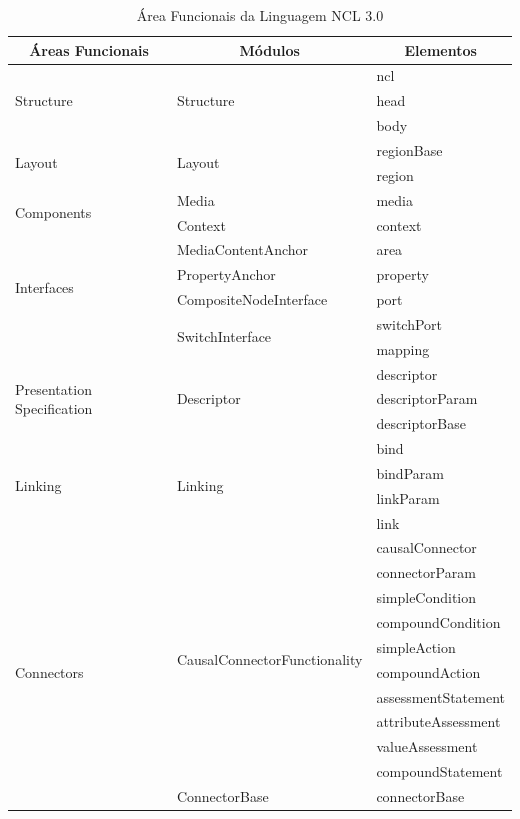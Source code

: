 \begin{table}[h]
\label{tab:modulosNCl}
\caption{Área Funcionais da Linguagem NCL 3.0 \cite{soares2009programando}}
\centering
{
  \renewcommand\arraystretch{1.0}
  \begin{tabular}{|p{4.5cm}|p{6cm}|p{4cm}|} \hline
   \multicolumn{1}{|c|}{Áreas Funcionais} & \multicolumn{1}{c|}{Módulos} & \multicolumn{1}{c|}{Elementos} \\\hline 
   
   \multirow{3}{*}{Structure} & \multirow{3}{*}{Structure} & ncl\\\cline{3-3} && head\\\cline{3-3} && body\\\hline
   
   \multirow{2}{*}{Layout} & \multirow{2}{*}{Layout} & regionBase\\\cline{3-3} && region\\\hline
   \multirow{2}{*}{Components} & Media & media\\\cline{2-3} & Context & context\\\hline
   
   \multirow{4}{*}{Interfaces} & MediaContentAnchor & area\\\cline{2-3}
   & PropertyAnchor & property\\\cline{2-3}
   & CompositeNodeInterface & port\\\cline{2-3}
   &\multirow{2}{*}{SwitchInterface} & switchPort\\\cline{3-3} && mapping \\\hline
   
   \multirow{3}{*}{Presentation Specification} & \multirow{3}{*}{Descriptor} & descriptor \\\cline{3-3} 
   && descriptorParam \\\cline{3-3} && descriptorBase \\\hline
   
   \multirow{4}{*}{Linking} & \multirow{4}{*}{Linking} & bind\\\cline{3-3} && bindParam\\\cline{3-3} && linkParam\\\cline {3-3} && link\\\hline
      
   \multirow{11}{*}{Connectors} & \multirow{10}{*}{CausalConnectorFunctionality} & causalConnector\\\cline{3-3}&&
   connectorParam\\\cline{3-3} && simpleCondition\\\cline {3-3} && compoundCondition\\\cline{3-3} && simpleAction\\\cline{3-3} &&
   compoundAction\\\cline{3-3} && assessmentStatement\\\cline{3-3} &&
   attributeAssessment\\\cline{3-3} && valueAssessment\\\cline{3-3} &&
   compoundStatement\\\cline{2-3} & ConnectorBase & connectorBase \\\hline
  

\end{tabular}}
\end{table}
